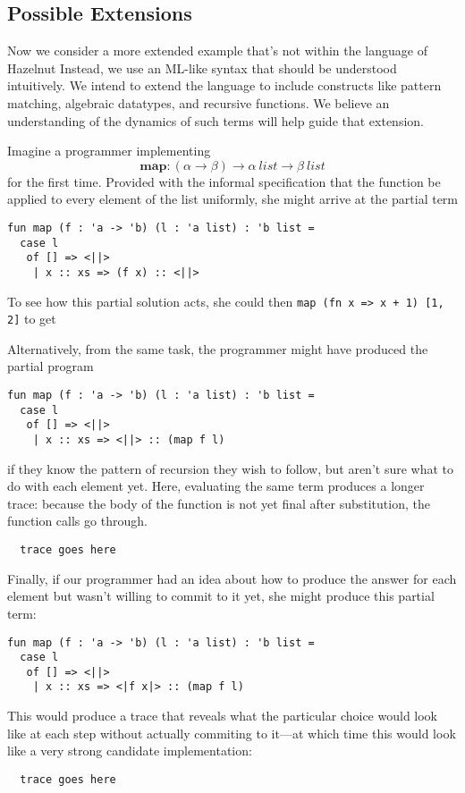 \subsection{Possible Extensions}
Now we consider a more extended example that's not within the language of
Hazelnut Instead, we use an ML-like syntax that should be understood
intuitively. We intend to extend the language to include constructs like
pattern matching, algebraic datatypes, and recursive functions. We believe
an understanding of the dynamics of such terms will help guide that
extension.

Imagine a programmer implementing $$\mathbf{map} : (\alpha \to \beta) \to
\alpha ~\mathit{list} \to \beta ~\mathit{list}$$ for the first time.
Provided with the informal specification that the function be applied to
every element of the list uniformly, she might arrive at the partial term
\begin{verbatim}
fun map (f : 'a -> 'b) (l : 'a list) : 'b list =
  case l
   of [] => <||>
    | x :: xs => (f x) :: <||>
\end{verbatim}
To see how this partial solution acts, she could then
\verb|map (fn x => x + 1) [1, 2]| to get

Alternatively, from the same task, the programmer might have produced the
partial program
\begin{verbatim}
fun map (f : 'a -> 'b) (l : 'a list) : 'b list =
  case l
   of [] => <||>
    | x :: xs => <||> :: (map f l)
\end{verbatim}
if they know the pattern of recursion they wish to follow, but aren't sure
what to do with each element yet. Here, evaluating the same term produces a
longer trace: because the body of the function is not yet final after
substitution, the function calls go through.

\begin{verbatim}
  trace goes here
\end{verbatim}

Finally, if our programmer had an idea about how to produce the answer for
each element but wasn't willing to commit to it yet, she might produce this
partial term:
\begin{verbatim}
fun map (f : 'a -> 'b) (l : 'a list) : 'b list =
  case l
   of [] => <||>
    | x :: xs => <|f x|> :: (map f l)
\end{verbatim}
This would produce a trace that reveals what the particular choice would
look like at each step without actually commiting to it---at which time
this would look like a very strong candidate implementation:
\begin{verbatim}
  trace goes here
\end{verbatim}
